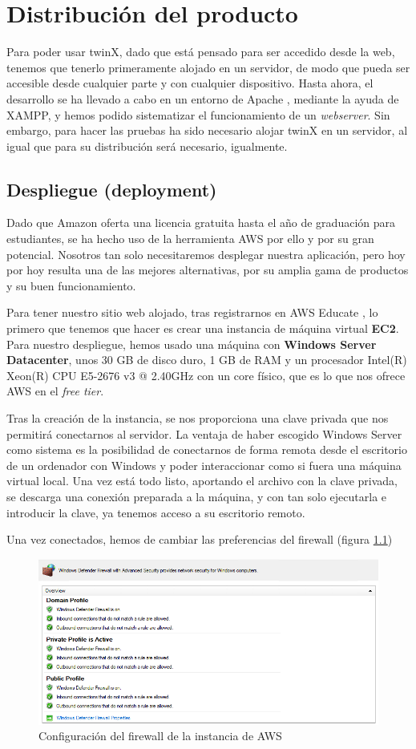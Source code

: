 \chapter{Distribución del producto}

Para poder usar twinX, dado que está pensado para ser accedido desde la web, tenemos que tenerlo primeramente alojado en un servidor, de modo que pueda ser accesible desde cualquier parte y con cualquier dispositivo. Hasta ahora, el desarrollo se ha llevado a cabo en un entorno de Apache \cite{apache}, mediante la ayuda de XAMPP, y  hemos podido sistematizar el funcionamiento de un \textit{webserver}. Sin embargo, para hacer las pruebas ha sido necesario alojar twinX en un servidor, al igual que para su distribución será necesario, igualmente.

\section{Despliegue (deployment)}

Dado que Amazon oferta una licencia gratuita hasta el año de graduación para estudiantes, se ha hecho uso de la herramienta AWS \cite{aws} por ello y por su gran potencial. Nosotros tan solo necesitaremos desplegar nuestra aplicación, pero hoy por hoy resulta una de las mejores alternativas, por su amplia gama de productos y su buen funcionamiento.

Para tener nuestro sitio web alojado, tras registrarnos en AWS Educate \cite{awseducate}, lo primero que tenemos que hacer es crear una instancia de máquina virtual \textbf{EC2}. Para nuestro despliegue, hemos usado una máquina con \textbf{Windows Server Datacenter}, unos 30 GB de disco duro, 1 GB de RAM y un procesador Intel(R) Xeon(R) CPU E5-2676 v3 @ 2.40GHz con un core físico, que es lo que nos ofrece AWS en el \textit{free tier}.

Tras la creación de la instancia, se nos proporciona una clave privada que nos permitirá conectarnos al servidor. La ventaja de haber escogido Windows Server como sistema es la posibilidad de conectarnos de forma remota desde el escritorio de un ordenador con Windows y poder interaccionar como si fuera una máquina virtual local. Una vez está todo listo, aportando el archivo con la clave privada, se descarga una conexión preparada a la máquina, y con tan solo ejecutarla e introducir la clave, ya tenemos acceso a su escritorio remoto.

Una vez conectados, hemos de cambiar las preferencias del firewall (figura \ref{fig:firewall}) 

\begin{figure}
	\centering
	\includegraphics[width=\linewidth]{img/firewall}
	\caption{Configuración del firewall de la instancia de AWS}
	\label{fig:firewall}
\end{figure}

